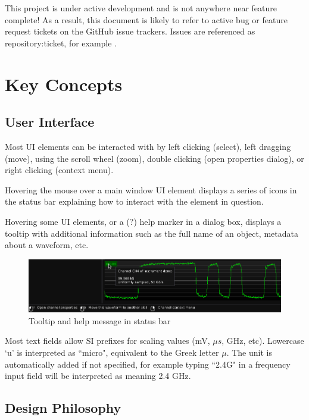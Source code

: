 This project is under active development and is not anywhere near feature complete! As a result, this document is
likely to refer to active bug or feature request tickets on the GitHub issue trackers. Issues are referenced as
repository:ticket, for example .

\section{Key Concepts}

\subsection{User Interface}

Most UI elements can be interacted with by left clicking (select), left dragging (move), using the scroll wheel (zoom),
double clicking (open properties dialog), or right clicking (context menu).

Hovering the mouse over a main window UI element displays a series of icons in the status bar explaining how to
interact with the element in question.

Hovering some UI elements, or a (?) help marker in a dialog box, displays a tooltip with additional information such as
the full name of an object, metadata about a waveform, etc.

\begin{figure}[h]
\centering
	\includegraphics[width=15cm]{ng-images/tooltip-help.png}
\caption{Tooltip and help message in status bar}
\label{tooltip-help}
\end{figure}


Most text fields allow SI prefixes for scaling values (mV, $\mu s$, GHz, etc). Lowercase `u' is interpreted as
``micro", equivalent to the Greek letter $\mu$. The unit is automatically added if not specified, for example typing
``2.4G" in a frequency input field will be interpreted as meaning 2.4 GHz.

\subsection{Design Philosophy}

